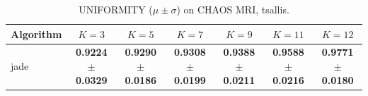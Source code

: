 \begin{table}[htbp]
\centering
\caption{UNIFORMITY ($\mu \pm \sigma$) on CHAOS MRI, tsallis.}
\label{tab:exp2-tsallis-uniformity}
\begin{tabular}{lcccccc}
\toprule
Algorithm & $K=3$ & $K=5$ & $K=7$ & $K=9$ & $K=11$ & $K=12$ \\
\midrule
jade & \textbf{0.9224 $\pm$ 0.0329} & \textbf{0.9290 $\pm$ 0.0186} & \textbf{0.9308 $\pm$ 0.0199} & \textbf{0.9388 $\pm$ 0.0211} & \textbf{0.9588 $\pm$ 0.0216} & \textbf{0.9771 $\pm$ 0.0180} \\
\bottomrule
\end{tabular}
\end{table}